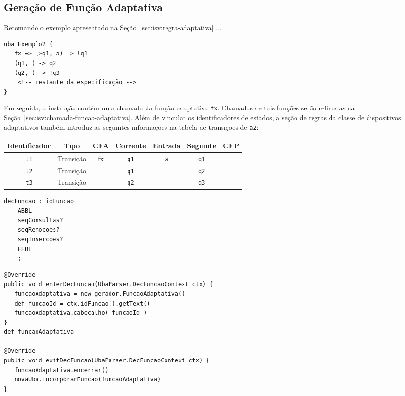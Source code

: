 \subsection{Geração de Função Adaptativa}
\label{sec:isv:geracao-funcao}

Retomando o exemplo apresentado na Seção~\ref{sec:isv:regra-adaptativa} ...

\begin{lstlisting}
uba Exemplo2 {
   fx => (>q1, a) -> !q1
   (q1, ) -> q2
   (q2, ) -> !q3
	<!-- restante da especificação -->
}
\end{lstlisting}

Em seguida, a instrução contém uma chamada da função adaptativa \lstinline|fx|. Chamadas de tais funções serão refinadas na Seção~\ref{sec:isv:chamada-funcao-adaptativa}. Além de vincular os identificadores de estados, a seção de regras da classe de dispositivos adaptativos também introduz as seguintes informações na tabela de transições de \lstinline|a2|:

\begin{center}\begin{tabular}{c c c c c c c}
Identificador   & Tipo  & CFA    & Corrente & Entrada & Seguinte & CFP \\
\hline
\lstinline|t1|	& Transição & fx  & \lstinline|q1| & \lstinline|a| & \lstinline|q1| & \\
\lstinline|t2|	& Transição &   & \lstinline|q1| & & \lstinline|q2| & \\
\lstinline|t3|	& Transição &   & \lstinline|q2| & & \lstinline|q3| & \\
\end{tabular}\end{center}

\begin{lstlisting}[style=antlr]
decFuncao : idFuncao
	ABBL
	seqConsultas?
	seqRemocoes?
	seqInsercoes?
	FEBL
	;
\end{lstlisting}

\begin{lstlisting}
@Override
public void enterDecFuncao(UbaParser.DecFuncaoContext ctx) {
   funcaoAdaptativa = new gerador.FuncaoAdaptativa()
   def funcaoId = ctx.idFuncao().getText()
   funcaoAdaptativa.cabecalho( funcaoId )
}
def funcaoAdaptativa

@Override
public void exitDecFuncao(UbaParser.DecFuncaoContext ctx) {
   funcaoAdaptativa.encerrar()
   novaUba.incorporarFuncao(funcaoAdaptativa)
}
\end{lstlisting}

